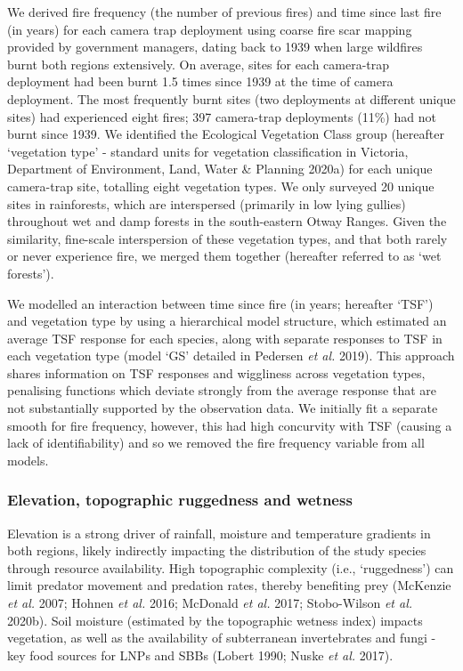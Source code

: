 \documentclass[11pt,a4paper,titlepage,twoside,openright]{style/unimelbthesis}
\begin{document}
\begin{mainmatter}
We derived fire frequency (the number of previous fires) and time since last fire (in years) for each camera trap deployment using coarse fire scar mapping provided by government managers, dating back to 1939 when large wildfires burnt both regions extensively. On average, sites for each camera-trap deployment had been burnt 1.5 times since 1939 at the time of camera deployment. The most frequently burnt sites (two deployments at different unique sites) had experienced eight fires; 397 camera-trap deployments (11\%) had not burnt since 1939. We identified the Ecological Vegetation Class group (hereafter `vegetation type' - standard units for vegetation classification in Victoria, Department of Environment, Land, Water \& Planning 2020a) for each unique camera-trap site, totalling eight vegetation types. We only surveyed 20 unique sites in rainforests, which are interspersed (primarily in low lying gullies) throughout wet and damp forests in the south-eastern Otway Ranges. Given the similarity, fine-scale interspersion of these vegetation types, and that both rarely or never experience fire, we merged them together (hereafter referred to as `wet forests').

We modelled an interaction between time since fire (in years; hereafter `TSF') and vegetation type by using a hierarchical model structure, which estimated an average TSF response for each species, along with separate responses to TSF in each vegetation type (model `GS' detailed in Pedersen \emph{et al.} 2019). This approach shares information on TSF responses and wiggliness across vegetation types, penalising functions which deviate strongly from the average response that are not substantially supported by the observation data. We initially fit a separate smooth for fire frequency, however, this had high concurvity with TSF (causing a lack of identifiability) and so we removed the fire frequency variable from all models.

\hypertarget{elevation-topographic-ruggedness-and-wetness}{%
\subsubsection{Elevation, topographic ruggedness and wetness}\label{elevation-topographic-ruggedness-and-wetness}}

Elevation is a strong driver of rainfall, moisture and temperature gradients in both regions, likely indirectly impacting the distribution of the study species through resource availability. High topographic complexity (i.e., `ruggedness') can limit predator movement and predation rates, thereby benefiting prey (McKenzie \emph{et al.} 2007; Hohnen \emph{et al.} 2016; McDonald \emph{et al.} 2017; Stobo-Wilson \emph{et al.} 2020b). Soil moisture (estimated by the topographic wetness index) impacts vegetation, as well as the availability of subterranean invertebrates and fungi - key food sources for LNPs and SBBs (Lobert 1990; Nuske \emph{et al.} 2017).


\end{mainmatter}
\end{document}
